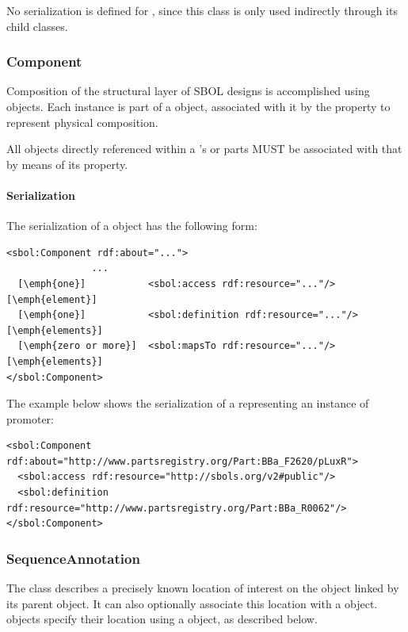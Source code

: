 No serialization is defined for , since this class is 
only used indirectly through its child classes.


\subsubsection{Component}
\label{sec:Component}
Composition of the structural layer of SBOL designs is accomplished using  objects. Each  instance is part of a  object, associated with it by the  property to represent  physical composition.  

All  objects directly referenced within a 's  or  parts MUST be associated with that  by means of its  property.

\paragraph{Serialization}

The serialization of a  object has the following form:

\begin{lstlisting}
<sbol:Component rdf:about="...">
               ...
  [\emph{one}]           <sbol:access rdf:resource="..."/> [\emph{element}]
  [\emph{one}]           <sbol:definition rdf:resource="..."/> [\emph{elements}]    
  [\emph{zero or more}]  <sbol:mapsTo rdf:resource="..."/> [\emph{elements}]
</sbol:Component>
\end{lstlisting}

The example below shows the serialization of a 
representing an instance of promoter:

\begin{lstlisting}
<sbol:Component rdf:about="http://www.partsregistry.org/Part:BBa_F2620/pLuxR">
  <sbol:access rdf:resource="http://sbols.org/v2#public"/>
  <sbol:definition rdf:resource="http://www.partsregistry.org/Part:BBa_R0062"/>
</sbol:Component>
\end{lstlisting}


\subsubsection{SequenceAnnotation}
\label{sec:SequenceAnnotation}
The  class describes a precisely known location of interest on the  object linked by its parent  object.  It can also optionally associate this location with a  object.  objects specify their location using a  object, as described below.

